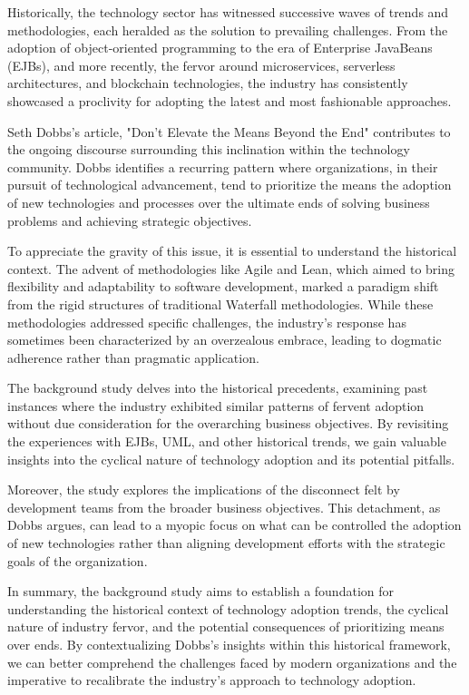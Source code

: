 \documentclass[a4Paper]{article}
\begin{document}
Historically, the technology sector has witnessed successive waves of trends and methodologies, each heralded as the solution to prevailing challenges. From the adoption of object-oriented programming to the era of Enterprise JavaBeans (EJBs), and more recently, the fervor around microservices, serverless architectures, and blockchain technologies, the industry has consistently showcased a proclivity for adopting the latest and most fashionable approaches.

Seth Dobbs's article, "Don't Elevate the Means Beyond the End" contributes to the ongoing discourse surrounding this inclination within the technology community. Dobbs identifies a recurring pattern where organizations, in their pursuit of technological advancement, tend to prioritize the means the adoption of new technologies and processes over the ultimate ends of solving business problems and achieving strategic objectives.

To appreciate the gravity of this issue, it is essential to understand the historical context. The advent of methodologies like Agile and Lean, which aimed to bring flexibility and adaptability to software development, marked a paradigm shift from the rigid structures of traditional Waterfall methodologies. While these methodologies addressed specific challenges, the industry's response has sometimes been characterized by an overzealous embrace, leading to dogmatic adherence rather than pragmatic application.

The background study delves into the historical precedents, examining past instances where the industry exhibited similar patterns of fervent adoption without due consideration for the overarching business objectives. By revisiting the experiences with EJBs, UML, and other historical trends, we gain valuable insights into the cyclical nature of technology adoption and its potential pitfalls.

Moreover, the study explores the implications of the disconnect felt by development teams from the broader business objectives. This detachment, as Dobbs argues, can lead to a myopic focus on what can be controlled the adoption of new technologies rather than aligning development efforts with the strategic goals of the organization.

In summary, the background study aims to establish a foundation for understanding the historical context of technology adoption trends, the cyclical nature of industry fervor, and the potential consequences of prioritizing means over ends. By contextualizing Dobbs's insights within this historical framework, we can better comprehend the challenges faced by modern organizations and the imperative to recalibrate the industry's approach to technology adoption.
\pagebreak
\end{document}
